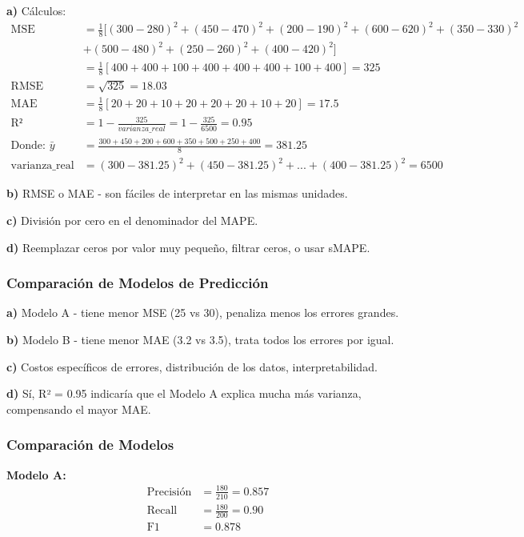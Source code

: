 \documentclass[12pt]{article}
\begin{document}
\textbf{a)} Cálculos:
\begin{align*}
\text{MSE} &= \frac{1}{8}[(300-280)^2 + (450-470)^2 + (200-190)^2 + (600-620)^2 + (350-330)^2\\ &+ (500-480)^2 + (250-260)^2 + (400-420)^2] \\
&= \frac{1}{8}[400 + 400 + 100 + 400 + 400 + 400 + 100 + 400] = 325 \\
\text{RMSE} &= \sqrt{325} = 18.03 \\
\text{MAE} &= \frac{1}{8}[20 + 20 + 10 + 20 + 20 + 20 + 10 + 20] = 17.5 \\
\text{R²} &= 1 - \frac{325}{varianza\_real} = 1 - \frac{325}{6500} = 0.95 \\
\text{Donde: } \bar{y} &= \frac{300+450+200+600+350+500+250+400}{8} = 381.25 \\
\text{varianza\_real} &= (300-381.25)^2 + (450-381.25)^2 + ... + (400-381.25)^2 = 6500
\end{align*}

\textbf{b)} RMSE o MAE - son fáciles de interpretar en las mismas unidades.

\textbf{c)} División por cero en el denominador del MAPE.

\textbf{d)} Reemplazar ceros por valor muy pequeño, filtrar ceros, o usar sMAPE.

\subsubsection{Comparación de Modelos de Predicción}

\textbf{a)} Modelo A - tiene menor MSE (25 vs 30), penaliza menos los errores grandes.

\textbf{b)} Modelo B - tiene menor MAE (3.2 vs 3.5), trata todos los errores por igual.

\textbf{c)} Costos específicos de errores, distribución de los datos, interpretabilidad.

\textbf{d)} Sí, R² = 0.95 indicaría que el Modelo A explica mucha más varianza, compensando el mayor MAE.

\subsubsection{Comparación de Modelos}

\textbf{Modelo A:}
\begin{align*}
\text{Precisión} &= \frac{180}{210} = 0.857 \\
\text{Recall} &= \frac{180}{200} = 0.90 \\
\text{F1} &= 0.878
\end{align*}
\end{document}
